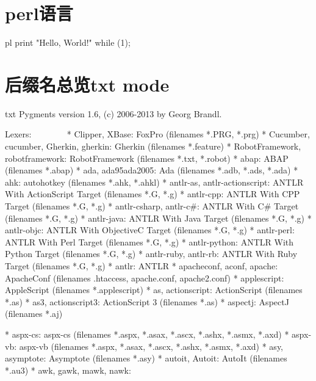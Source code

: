 \documentclass[11pt,oneside]{book}
\begin{document}
\begin{common-format}
\chapter{perl语言}
\begin{xverbatim}{pl}
print "Hello, World!\n" while (1);
\end{xverbatim}




\chapter{后缀名总览txt mode}
\begin{xverbatim}{txt}
Pygments version 1.6, (c) 2006-2013 by Georg Brandl.

Lexers:
~~~~~~~
* Clipper, XBase:
    FoxPro (filenames *.PRG, *.prg)
* Cucumber, cucumber, Gherkin, gherkin:
    Gherkin (filenames *.feature)
* RobotFramework, robotframework:
    RobotFramework (filenames *.txt, *.robot)
* abap:
    ABAP (filenames *.abap)
* ada, ada95ada2005:
    Ada (filenames *.adb, *.ads, *.ada)
* ahk:
    autohotkey (filenames *.ahk, *.ahkl)
* antlr-as, antlr-actionscript:
    ANTLR With ActionScript Target (filenames *.G, *.g)
* antlr-cpp:
    ANTLR With CPP Target (filenames *.G, *.g)
* antlr-csharp, antlr-c#:
    ANTLR With C# Target (filenames *.G, *.g)
* antlr-java:
    ANTLR With Java Target (filenames *.G, *.g)
* antlr-objc:
    ANTLR With ObjectiveC Target (filenames *.G, *.g)
* antlr-perl:
    ANTLR With Perl Target (filenames *.G, *.g)
* antlr-python:
    ANTLR With Python Target (filenames *.G, *.g)
* antlr-ruby, antlr-rb:
    ANTLR With Ruby Target (filenames *.G, *.g)
* antlr:
    ANTLR 
* apacheconf, aconf, apache:
    ApacheConf (filenames .htaccess, 
    apache.conf, apache2.conf)
* applescript:
    AppleScript (filenames *.applescript)
* as, actionscript:
    ActionScript (filenames *.as)
* as3, actionscript3:
    ActionScript 3 (filenames *.as)
* aspectj:
    AspectJ (filenames *.aj)
    
* aspx-cs:
    aspx-cs (filenames *.aspx, *.asax, 
    *.ascx, *.ashx, *.asmx, *.axd)
* aspx-vb:
    aspx-vb (filenames *.aspx, *.asax, 
    *.ascx, *.ashx, *.asmx, *.axd)
* asy, asymptote:
    Asymptote (filenames *.asy)
* autoit, Autoit:
    AutoIt (filenames *.au3)
* awk, gawk, mawk, nawk:


\end{xverbatim}
\end{common-format}
\end{document}
